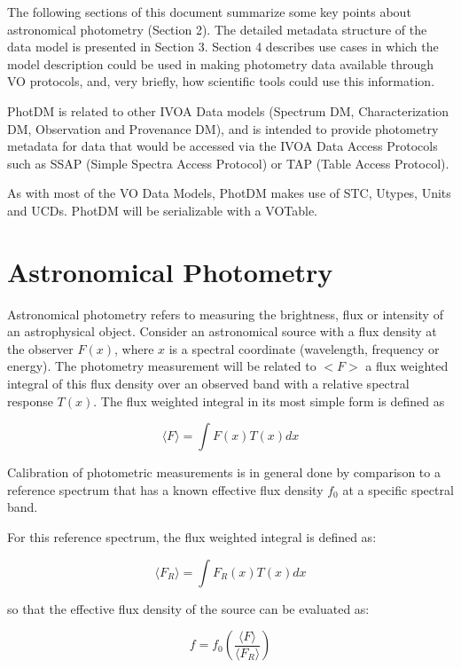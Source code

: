 \documentclass[11pt,a4paper]{ivoa}
\begin{document}
The following sections of this document summarize some key points 
about astronomical photometry (Section 2). The detailed metadata 
structure of the data model is presented in Section 3. Section 4 
describes use cases in which the model description could be used in 
making photometry data available through VO protocols, and, very briefly, 
how scientific tools could use this information.


PhotDM is related to other IVOA Data models (Spectrum DM, Characterization DM, 
Observation and Provenance DM),  and is intended to provide photometry 
metadata for data that would be accessed via the IVOA Data Access Protocols 
such as SSAP (Simple Spectra Access Protocol) or TAP (Table Access Protocol).

As with most of the VO Data Models, PhotDM makes use of STC, Utypes, Units 
and UCDs. PhotDM will be serializable with a VOTable.

\section{Astronomical Photometry}
Astronomical photometry refers to measuring the brightness, flux or 
intensity of an astrophysical object. Consider an astronomical source 
with a flux density at the observer $F(x)$, where $x$ is a spectral coordinate 
(wavelength, frequency or energy).  The photometry measurement will be related 
to $<F>$ a flux weighted integral of this flux density over an observed band 
with a relative spectral response $T(x)$. The flux weighted integral in its most 
simple form is defined as


\begin{equation} \label{eq:1}
\langle F\rangle = \int F(x)T(x)dx 
\end{equation}

Calibration of photometric measurements is in general done by comparison to a 
reference spectrum that has a known effective flux density $f_0$ at a specific 
spectral band.


For this reference spectrum, the flux weighted integral is defined as:

\begin{equation} \label{eq:2}
\langle F_R \rangle= \int F_R (x)T(x)dx 
\end{equation}


so that the effective flux density of the source can be evaluated as:

\begin{equation} \label{eq:3}
f = f_0 ( \frac{\langle F\rangle }{\langle F_R \rangle } ) 
\end{equation}
\end{document}
